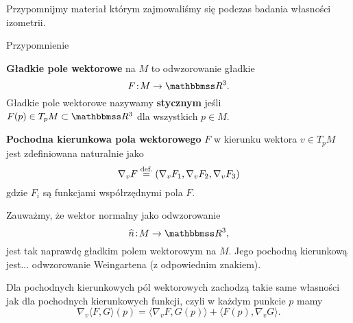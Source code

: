 Przypomnijmy materiał którym zajmowaliśmy się podczas badania własności izometrii.
\begin{frame}[<+->]{Przypomnienie}

\begin{definicja}
\textbf{Gładkie pole wektorowe} na $M$ to odwzorowanie gładkie \[F\colon M\to \R^3.\]
Gładkie pole wektorowe nazywamy \textbf{stycznym} jeśli $F(p)\in T_pM\subset \R^3$ dla wszystkich $p\in M$.
\end{definicja}
\begin{definicja}
\textbf{Pochodna kierunkowa pola wektorowego} $F$ w kierunku wektora $v\in T_p M$ jest zdefiniowana naturalnie jako
\[\nabla_v F\define(\nabla_v F_1,\nabla_vF_2,\nabla_vF_3)\] gdzie $F_i$ są funkcjami współrzędnymi pola $F$.
\end{definicja}

\end{frame}
\begin{frame}

\begin{przyklad}
Zauważmy, że wektor normalny jako odwzorowanie
\[\widehat{n}\colon M\to\R^3,\]
jest tak naprawdę gładkim polem wektorowym na $M$. Jego pochodną kierunkową 
jest...  odwzorowanie Weingartena (z odpowiednim znakiem).
\end{przyklad}


\pause \begin{lemat}
Dla pochodnych kierunkowych pól wektorowych zachodzą takie same własności jak dla pochodnych kierunkowych funkcji, 
 \pause czyli w każdym punkcie $p$ mamy 
\[\nabla_v\langle F,G\rangle(p)=\langle\nabla_vF,G(p)\rangle+\langle F(p),\nabla_vG\rangle.\]
\end{lemat}
 
\end{frame}
